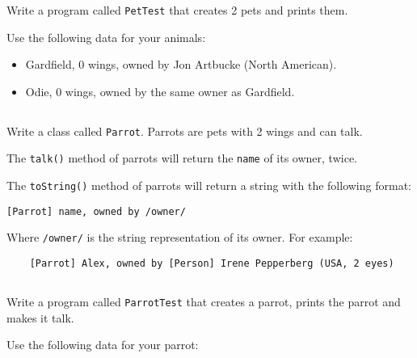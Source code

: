 \documentclass[a4paper, 11pt]{article}
\begin{document}
Write a program called \verb+PetTest+ that creates 2 pets and prints
them.

Use the following data for your animals:

\begin{itemize}

  \item Gardfield, 0 wings, owned by Jon Artbucke (North American).

  \item Odie, 0 wings, owned by the same owner as Gardfield.

\end{itemize}











\subsection{}

Write a class called \verb+Parrot+. Parrots are pets with 2 wings and can talk.

The \verb+talk()+ method of parrots will return the \verb+name+ of its owner,
twice.

The \verb+toString()+ method of parrots will return a string with the
following format:

\verb+[Parrot] name, owned by /owner/+

Where \verb+/owner/+ is the string representation of its owner. For example:

\verb+    [Parrot] Alex, owned by [Person] Irene Pepperberg (USA, 2 eyes)+



\subsection{}

Write a program called \verb+ParrotTest+ that creates a parrot, prints
the parrot and makes it talk.

Use the following data for your parrot:
\end{document}
